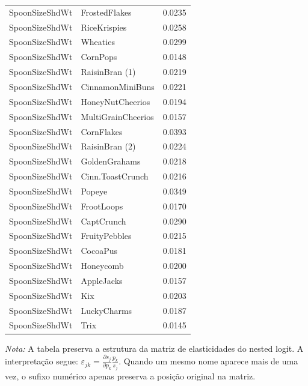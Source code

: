 \begin{table}[H]
\begin{tabular}{llr}
SpoonSizeShdWt & FrostedFlakes & 0.0235 \\
SpoonSizeShdWt & RiceKrispies & 0.0258 \\
SpoonSizeShdWt & Wheaties & 0.0299 \\
SpoonSizeShdWt & CornPops & 0.0148 \\
SpoonSizeShdWt & RaisinBran (1) & 0.0219 \\
SpoonSizeShdWt & CinnamonMiniBuns & 0.0221 \\
SpoonSizeShdWt & HoneyNutCheerios & 0.0194 \\
SpoonSizeShdWt & MultiGrainCheerios & 0.0157 \\
SpoonSizeShdWt & CornFlakes & 0.0393 \\
SpoonSizeShdWt & RaisinBran (2) & 0.0224 \\
SpoonSizeShdWt & GoldenGrahams & 0.0218 \\
SpoonSizeShdWt & Cinn.ToastCrunch & 0.0216 \\
SpoonSizeShdWt & Popeye & 0.0349 \\
SpoonSizeShdWt & FrootLoops & 0.0170 \\
SpoonSizeShdWt & CaptCrunch & 0.0290 \\
SpoonSizeShdWt & FruityPebbles & 0.0215 \\
SpoonSizeShdWt & CocoaPus & 0.0181 \\
SpoonSizeShdWt & Honeycomb & 0.0200 \\
SpoonSizeShdWt & AppleJacks & 0.0157 \\
SpoonSizeShdWt & Kix & 0.0203 \\
SpoonSizeShdWt & LuckyCharms & 0.0187 \\
SpoonSizeShdWt & Trix & 0.0145 \\
\bottomrule
\end{tabular}

\vspace{0.3em}
\footnotesize
\textit{Nota:} A tabela preserva a estrutura da matriz de elasticidades do nested logit. A interpretação segue: $\varepsilon_{jk}=\frac{\partial s_j}{\partial p_k}\frac{p_k}{s_j}$. Quando um mesmo nome aparece mais de uma vez, o sufixo numérico apenas preserva a posição original na matriz.
\end{table}
\endgroup


